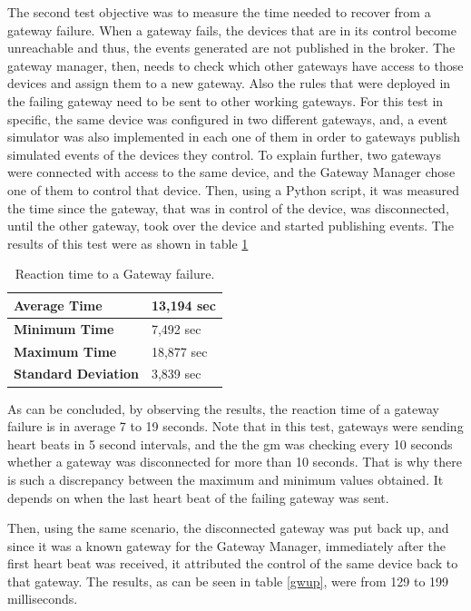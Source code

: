 The second test objective was to measure the time needed to recover from a gateway failure. When a gateway fails, the devices that are in its control become unreachable and thus, the events generated are not published in the broker. The gateway manager, then, needs to check which other gateways have access to those devices and assign them to a new gateway. Also the rules that were deployed in the failing gateway need to be sent to other working gateways. For this test in specific, the same device was configured in two different gateways, and, a event simulator was also implemented in each one of them in order to gateways publish simulated events of the devices they control. To explain further, two gateways were connected with access to the same device, and the Gateway Manager chose one of them to control that device. Then, using a Python script, it was measured the time since the gateway, that was in control of the device, was disconnected, until the other gateway, took over the device and started publishing events. The results of this test were as shown in table \ref{gwdown}

 
\begin{table}[H]

	\begin{tabular}{|l|l|}
		\hline
		\textbf{Average Time}       & 13,194 sec \\ \hline
		\textbf{Minimum Time}       & 7,492 sec \\ \hline
		\textbf{Maximum Time}       & 18,877 sec \\ \hline
		\textbf{Standard Deviation} & 3,839 sec \\ \hline
	\end{tabular}
	\centering
	\caption{Reaction time to a Gateway failure.}
	\label{gwdown}
\end{table}

As can be concluded, by observing the results, the reaction time of a gateway failure is in average 7 to 19 seconds. Note that in this test, gateways were sending heart beats in 5 second intervals, and the the \ac{gm} was checking every 10 seconds whether a gateway was disconnected for more than 10 seconds. That is why there is such a discrepancy between the maximum and minimum values obtained. It depends on when the last heart beat of the failing gateway was sent.

Then, using the same scenario, the disconnected gateway was put back up, and since it was a known gateway for the Gateway Manager, immediately after the first heart beat was received, it attributed the control of the same device back to that gateway. The results, as can be seen in table \ref{gwup}, were from 129 to 199 milliseconds.

